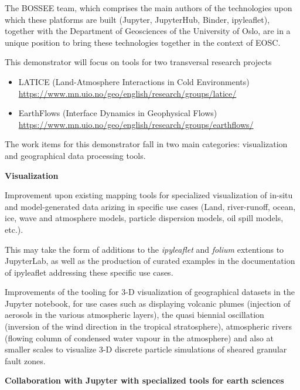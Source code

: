 \begin{task}[
  title=Geosciences application,
  id=geoscience,
  lead=UIO,
  PM=25,
  wphases={0-48},
  partners={QS,SRL,UPSUD,EGI}
]
The BOSSEE team, which comprises the main authors of the technologies upon
which these platforms are built (Jupyter, JupyterHub, Binder, ipyleaflet),
together with the Department of Geosciences of the University of Oslo, are
in a unique position to bring these technologies together in the context of
EOSC.

This demonstrator will focus on tools for two transversal research projects

\begin{itemize}
\item LATICE (Land-Atmosphere Interactions in Cold Environments)
\url{https://www.mn.uio.no/geo/english/research/groups/latice/}
\item EarthFlows (Interface Dynamics in Geophysical Flows)
\url{https://www.mn.uio.no/geo/english/research/groups/earthflows/}
\end{itemize}

The work items for this demonstrator fall in two main categories:
visualization and geographical data processing tools.

\textbf{Visualization}

\begin{compactitem}
  \item Improvement upon existing mapping tools for specialized
    visualization of in-situ and model-generated data arizing in
    specific use cases (Land, river-runoff, ocean, ice, wave and
    atmosphere models, particle dispersion models, oil spill models,
    etc.).

    This may take the form of additions to the \emph{ipyleaflet} and
    \emph{folium} extentions to JupyterLab, as well as the production of
    curated examples in the documentation of ipyleaflet addressing these
    specific use cases.

  \item Improvements of the tooling for 3-D visualization of
    geographical datasets in the Jupyter notebook, for use cases such as
    displaying volcanic plumes (injection of aerosols in the various
    atmospheric layers), the quasi biennial oscillation (inversion of
    the wind direction in the tropical stratosphere), atmospheric rivers
    (flowing column of condensed water vapour in the atmosphere) and
    also at smaller scales to visualize 3-D discrete particle simulations
    of sheared granular fault zones.
\end{compactitem}

\textbf{Collaboration with Jupyter with specialized tools for earth sciences}


\end{task}
